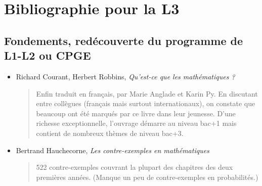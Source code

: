 \documentclass{article}
\begin{document}
\newpage
\section{Bibliographie pour la L3}

\subsection{Fondements, redécouverte du programme de L1-L2 ou CPGE}
\begin{mdframed}
\begin{itemize}
\item Richard Courant, Herbert Robbins, \emph{Qu'est-ce que les mathématiques ?}
\begin{quote}
Enfin traduit en français, par Marie Anglade et Karin Py. En discutant entre collègues (français mais surtout internationaux), on constate que beaucoup ont été marqués par ce livre dans leur jeunesse. D'une richesse exceptionnelle, l'ouvrage démarre au niveau bac+1 mais contient de nombreux thèmes de  niveau bac+3.%
\end{quote}
\item Bertrand Hauchecorne, \emph{Les contre-exemples en mathématiques}
\begin{quote}
522 contre-exemples couvrant la plupart des chapitres des deux premières années. (Manque un peu de contre-exemples en probabilités.)
\end{quote}
\end{itemize}
\end{mdframed}
\end{document}
